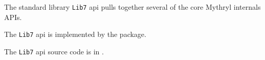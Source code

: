 
The standard library {\tt Lib7} api pulls together several of the core 
Mythryl internals APIs.

The {\tt Lib7} api is implemented by the  package.

The {\tt Lib7} api source code is in .

